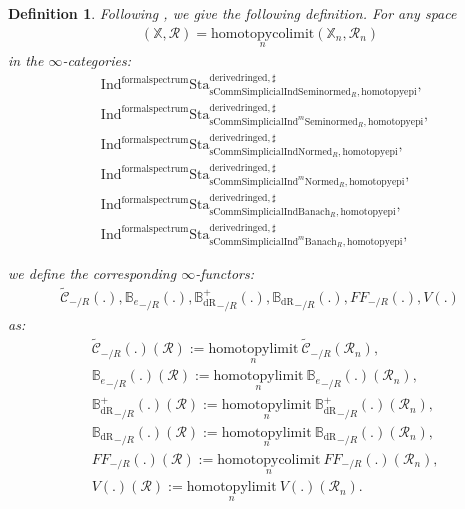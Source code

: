 \documentclass[12pt]{book}
\newtheorem{definition}{Definition}
\begin{document}
  

\begin{definition}
Following \cite[Definition 9.3.3, Definition 9.3.5, Definition 9.3.11, Definition 9.3.9]{KL1}, \cite{KL2} we give the following definition. For any space
\begin{align}
(\mathbb{X},\mathcal{R})=\underset{n}{\mathrm{homotopycolimit}}(\mathbb{X}_n,\mathcal{R}_n)	
\end{align}
in the $\infty$-categories:
\begin{align}
&\mathrm{Ind}^\mathrm{formalspectrum}\mathrm{Sta}^\mathrm{derivedringed,\sharp}_{\mathrm{sComm}\mathrm{Simplicial}\mathrm{Ind}\mathrm{Seminormed}_R,\mathrm{homotopyepi}},\\
&\mathrm{Ind}^\mathrm{formalspectrum}\mathrm{Sta}^\mathrm{derivedringed,\sharp}_{\mathrm{sComm}\mathrm{Simplicial}\mathrm{Ind}^m\mathrm{Seminormed}_R,\mathrm{homotopyepi}},\\
&\mathrm{Ind}^\mathrm{formalspectrum}\mathrm{Sta}^\mathrm{derivedringed,\sharp}_{\mathrm{sComm}\mathrm{Simplicial}\mathrm{Ind}\mathrm{Normed}_R,\mathrm{homotopyepi}},\\
&\mathrm{Ind}^\mathrm{formalspectrum}\mathrm{Sta}^\mathrm{derivedringed,\sharp}_{\mathrm{sComm}\mathrm{Simplicial}\mathrm{Ind}^m\mathrm{Normed}_R,\mathrm{homotopyepi}},\\
&\mathrm{Ind}^\mathrm{formalspectrum}\mathrm{Sta}^\mathrm{derivedringed,\sharp}_{\mathrm{sComm}\mathrm{Simplicial}\mathrm{Ind}\mathrm{Banach}_R,\mathrm{homotopyepi}},\\
&\mathrm{Ind}^\mathrm{formalspectrum}\mathrm{Sta}^\mathrm{derivedringed,\sharp}_{\mathrm{sComm}\mathrm{Simplicial}\mathrm{Ind}^m\mathrm{Banach}_R,\mathrm{homotopyepi}},	
\end{align}

we define the corresponding $\infty$-functors:
\begin{align}
\widetilde{\mathcal{C}}_{-/R}(.),{\mathbb{B}_e}_{-/R}(.),{\mathbb{B}_\mathrm{dR}^+}_{-/R}(.),{\mathbb{B}_\mathrm{dR}}_{-/R}(.),{FF}_{-/R}(.),V(.)	
\end{align}
as:
\begin{align}
&\widetilde{\mathcal{C}}_{-/R}(.)(\mathcal{R}):=\underset{n}{\mathrm{homotopylimit}}~\widetilde{\mathcal{C}}_{-/R}(\mathcal{R}_n),\\
&{\mathbb{B}_e}_{-/R}(.)(\mathcal{R}):=\underset{n}{\mathrm{homotopylimit}}~{\mathbb{B}_e}_{-/R}(.)(\mathcal{R}_n),\\
&{\mathbb{B}_\mathrm{dR}^+}_{-/R}(.)(\mathcal{R}):=\underset{n}{\mathrm{homotopylimit}}~{\mathbb{B}_\mathrm{dR}^+}_{-/R}(.)(\mathcal{R}_n),\\
&{\mathbb{B}_\mathrm{dR}}_{-/R}(.)(\mathcal{R}):=\underset{n}{\mathrm{homotopylimit}}~{\mathbb{B}_\mathrm{dR}}_{-/R}(.)(\mathcal{R}_n),\\
&{{FF}}_{-/R}(.)(\mathcal{R}):=\underset{n}{\mathrm{homotopycolimit}}~{{FF}}_{-/R}(.)(\mathcal{R}_n),\\	
&V(.)(\mathcal{R}):=\underset{n}{\mathrm{homotopylimit}}~V(.)(\mathcal{R}_n).
\end{align}
\end{definition}
\end{document}

